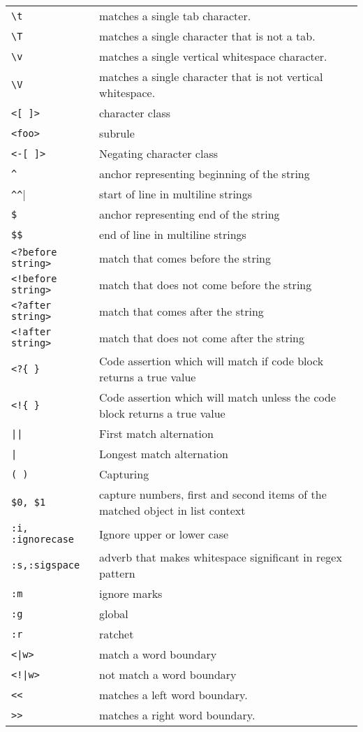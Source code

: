 \documentclass[12pt]{article}
\begin{document}
\begin{longtable}{p{0.25\linewidth}p{0.75\linewidth}}
		\verb|\t| & matches a single tab character.\\
		\verb|\T| & matches a single character that is not a tab.\\
		\verb|\v| & matches a single vertical whitespace character.\\
		\verb|\V| & matches a single character that is not vertical whitespace.\\		
		\verb|<[ ]>|	& character class\\
		\verb|<foo>| & subrule\\
		\verb|<-[ ]>|	& Negating character class\\
		\verb|^|	& anchor representing beginning of the string\\
		\verb|^^|	& start of line in multiline strings\\
		\verb|$|	& anchor representing end of the string\\
		\verb|$$|	& end of line in multiline strings\\
		\verb|<?before string>|	& match that comes before the string\\
		\verb|<!before string>|	& match that does not come before the string\\
		\verb|<?after string>|	& match that comes after the string\\
		\verb|<!after string>|	& match that does not come after the string\\
		\verb|<?{ }|	& Code assertion which will match if code block returns a true value\\
		\verb|<!{ }|	& Code assertion which will match unless the code block returns a true value\\
		\verb!||!	& First match alternation\\
		\verb!|!	& Longest match alternation\\
		\verb|( )|	& Capturing\\
		\verb|$0, $1|	& capture numbers, first and second items of the matched object in list context\\
		\verb|:i, :ignorecase|	& Ignore upper or lower case\\
		\verb|:s,:sigspace|	& adverb that makes whitespace significant in regex pattern\\				
		\verb|:m|   & ignore marks\\
		\verb|:g|   & global\\
		\verb|:r|   & ratchet\\
		\verb!<|w>! & match a word boundary\\
		\texttt{<!|w>} & not match a word boundary\\
		\verb|<<| & matches a left word boundary.\\
		\verb|>>| & matches a right word boundary.\\
		\bottomrule
		
		
		
	\end{longtable}
\end{document}
